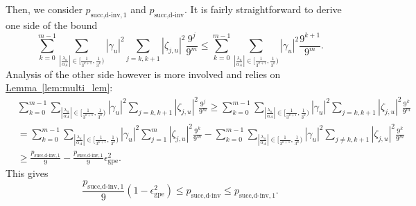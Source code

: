 \documentclass[letterpaper,onecolumn,11pt,accepted=2026-02-14]{quantumarticle}
\newcommand{\abs}[1]{\left\lvert#1\right\rvert}
\theoremstyle{remark}
\theoremstyle{plain}
\newcommand{\lem}[1]{\hyperref[lem:#1]{Lemma~\ref*{lem:#1}}}
\begin{document}
Then, we consider $p_{\text{succ,d-inv},1}$ and $p_{\text{succ,d-inv}}$. It is fairly straightforward to derive one side of the bound
\begin{equation}
    \sum_{k=0}^{m-1}\sum_{\abs{\frac{\lambda_u}{\alpha_A}}\in\big[\frac{1}{3^{k+1}},\frac{1}{3^k}\big)}
    \abs{\gamma_u}^2
    \sum_{j= k,k+1}\abs{\zeta_{j,u}}^2\frac{9^{j}}{9^m}
    \leq\sum_{k=0}^{m-1}\sum_{\abs{\frac{\lambda_u}{\alpha_A}}\in\big[\frac{1}{3^{k+1}},\frac{1}{3^k}\big)}
    \abs{\gamma_u}^2
    \frac{9^{k+1}}{9^m}.
\end{equation}
Analysis of the other side however is more involved and relies on \lem{multi_lem}:
\begin{equation}
\begin{aligned}
    &\sum_{k=0}^{m-1}\sum_{\abs{\frac{\lambda_u}{\alpha_A}}\in\big[\frac{1}{3^{k+1}},\frac{1}{3^k}\big)}
    \abs{\gamma_u}^2
    \sum_{j= k,k+1}\abs{\zeta_{j,u}}^2\frac{9^{j}}{9^m}
    \geq\sum_{k=0}^{m-1}\sum_{\abs{\frac{\lambda_u}{\alpha_A}}\in\big[\frac{1}{3^{k+1}},\frac{1}{3^k}\big)}
    \abs{\gamma_u}^2
    \sum_{j= k,k+1}\abs{\zeta_{j,u}}^2
    \frac{9^{k}}{9^m}\\
    &=\sum_{k=0}^{m-1}\sum_{\abs{\frac{\lambda_u}{\alpha_A}}\in\big[\frac{1}{3^{k+1}},\frac{1}{3^k}\big)}
    \abs{\gamma_u}^2
    \sum_{j= 1}^m\abs{\zeta_{j,u}}^2
    \frac{9^{k}}{9^m}
    -\sum_{k=0}^{m-1}\sum_{\abs{\frac{\lambda_u}{\alpha_A}}\in\big[\frac{1}{3^{k+1}},\frac{1}{3^k}\big)}
    \abs{\gamma_u}^2
    \sum_{j\neq k,k+1}\abs{\zeta_{j,u}}^2
    \frac{9^{k}}{9^m}\\
    &\geq \frac{p_{\text{succ,d-inv},1}}{9}-\frac{p_{\text{succ,d-inv},1}}{9}\epsilon_{\text{gpe}}^2.
\end{aligned}
\end{equation}
This gives
\begin{equation}
    \frac{p_{\text{succ,d-inv},1}}{9}\left(1-\epsilon_{\text{gpe}}^2\right)
    \leq p_{\text{succ,d-inv}}
    \leq p_{\text{succ,d-inv},1}.
\end{equation}
\end{document}
